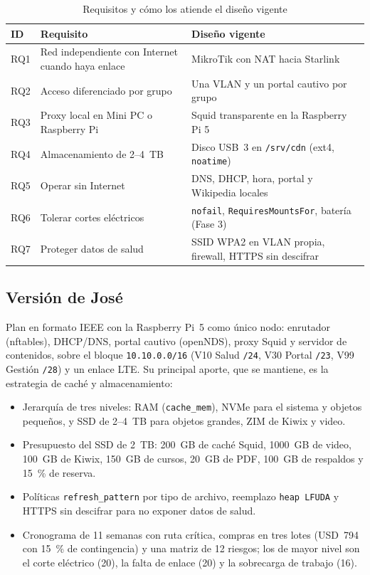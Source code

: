 \documentclass[conference]{IEEEtran}
\begin{document}
\begin{table}[!htbp]
\centering
\caption{Requisitos y cómo los atiende el diseño vigente}
\label{tab:req}
\scriptsize
\begin{tabularx}{\columnwidth}{lYY}
\toprule
\textbf{ID} & \textbf{Requisito} & \textbf{Diseño vigente} \\
\midrule
RQ1 & Red independiente con Internet cuando haya enlace & MikroTik con NAT hacia Starlink \\
RQ2 & Acceso diferenciado por grupo & Una VLAN y un portal cautivo por grupo \\
RQ3 & Proxy local en Mini PC o Raspberry Pi & Squid transparente en la Raspberry Pi 5 \\
RQ4 & Almacenamiento de 2--4~TB & Disco USB~3 en \texttt{/srv/cdn} (ext4, \texttt{noatime}) \\
RQ5 & Operar sin Internet & DNS, DHCP, hora, portal y Wikipedia locales \\
RQ6 & Tolerar cortes eléctricos & \texttt{nofail}, \texttt{RequiresMountsFor}, batería (Fase 3) \\
RQ7 & Proteger datos de salud & SSID WPA2 en VLAN propia, firewall, HTTPS sin descifrar \\
\bottomrule
\end{tabularx}
\end{table}

\subsection{Versión de José}
Plan en formato IEEE con la Raspberry Pi~5 como único nodo: enrutador (nftables), DHCP/DNS, portal cautivo (openNDS), proxy Squid y servidor de contenidos, sobre el bloque \texttt{10.10.0.0/16} (V10 Salud \texttt{/24}, V30 Portal \texttt{/23}, V99 Gestión \texttt{/28}) y un enlace LTE. Su principal aporte, que se mantiene, es la estrategia de caché y almacenamiento:
\begin{itemize}
\item Jerarquía de tres niveles: RAM (\texttt{cache\_mem}), NVMe para el sistema y objetos pequeños, y SSD de 2--4~TB para objetos grandes, ZIM de Kiwix y video.
\item Presupuesto del SSD de 2~TB: 200~GB de caché Squid, 1000~GB de video, 100~GB de Kiwix, 150~GB de cursos, 20~GB de PDF, 100~GB de respaldos y 15~\% de reserva.
\item Políticas \texttt{refresh\_pattern} por tipo de archivo, reemplazo \texttt{heap LFUDA} y HTTPS sin descifrar para no exponer datos de salud.
\item Cronograma de 11 semanas con ruta crítica, compras en tres lotes (USD~794 con 15~\% de contingencia) y una matriz de 12 riesgos; los de mayor nivel son el corte eléctrico (20), la falta de enlace (20) y la sobrecarga de trabajo (16).
\end{itemize}
\end{document}
